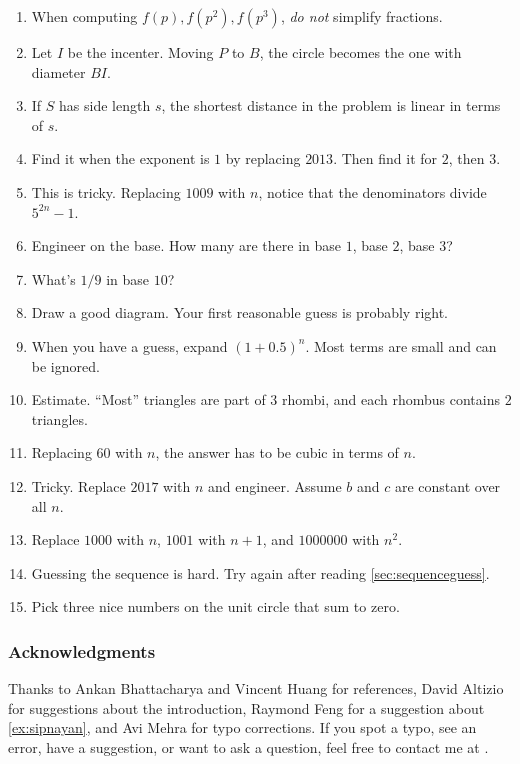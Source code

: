 \documentclass[11pt,paper=letter]{scrartcl}
\begin{document}
\begin{enumerate}[topsep=2pt,itemsep=-0.7ex,partopsep=1ex,parsep=1ex,leftmargin=0pt]
\item \label{h:14} When computing $f(p), f(p^2), f(p^3)$, \textit{do not} simplify fractions.
\item \label{h:9} Let $I$ be the incenter. Moving $P$ to $B$, the circle becomes the one with diameter $BI$.
\item \label{h:13} If $S$ has side length $s$, the shortest distance in the problem is linear in terms of $s$.
\item \label{h:5} Find it when the exponent is $1$ by replacing $2013$. Then find it for $2$, then $3$.
\item \label{h:15} This is tricky. Replacing $1009$ with $n$, notice that the denominators divide $5^{2n} - 1$.
\item \label{h:7} Engineer on the base. How many are there in base $1$, base $2$, base $3$?
\item \label{h:4} What's $1/9$ in base $10$?
\item \label{h:12} Draw a good diagram. Your first reasonable guess is probably right.
\item \label{h:2} When you have a guess, expand $(1 + 0.5)^n$. Most terms are small and can be ignored.
\item \label{h:11} Estimate. ``Most'' triangles are part of $3$ rhombi, and each rhombus contains $2$ triangles.
\item \label{h:6} Replacing $60$ with $n$, the answer has to be cubic in terms of $n$.
\item \label{h:10} Tricky. Replace $2017$ with $n$ and engineer. Assume $b$ and $c$ are constant over all $n$.
\item \label{h:1} Replace $1000$ with $n$, $1001$ with $n+1$, and $1000000$ with $n^2$.
\item \label{h:3} Guessing the sequence is hard. Try again after reading \autoref{sec:sequenceguess}.
\item \label{h:8} Pick three nice numbers on the unit circle that sum to zero.
\end{enumerate}

\subsubsection*{Acknowledgments}

Thanks to Ankan Bhattacharya and Vincent Huang for references, David Altizio for suggestions about the introduction, Raymond Feng for a suggestion about \autoref{ex:sipnayan}, and Avi Mehra for typo corrections. If you spot a typo, see an error, have a suggestion, or want to ask a question, feel free to contact me at .
\end{document}
